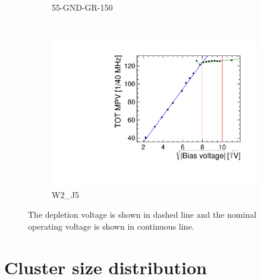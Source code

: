 \begin{figure}[htbp]
\begin{subfigure}[b]{0.33\textwidth}
    \caption{55-GND-GR-150}
  \end{subfigure}\\
  \begin{subfigure}[b]{0.33\textwidth}
    \includegraphics[width=\textwidth]{./figures/TestBeam/depletionVoltage_W0002_J05.pdf}
    \caption{W2\_J5}
  \end{subfigure}
  \caption{The depletion voltage is shown in dashed line and the nominal operating voltage is shown in continuous line.}
  \label{fig:depletionVoltage}
\end{figure}

\newpage
\section{Cluster size distribution}
